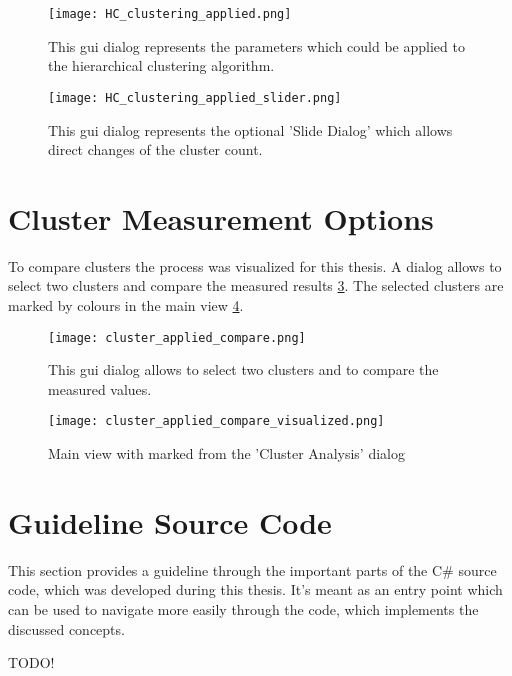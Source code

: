 \begin{figure}[ht]
    \centering
    \texttt{[image: HC\_clustering\_applied.png]}
    \caption{This gui dialog represents the parameters which could be applied to the hierarchical clustering algorithm.}
    \label{fig:applied_HC_clustering_GUI}
\end{figure}

\begin{figure}[ht]
    \centering
    \texttt{[image: HC\_clustering\_applied\_slider.png]}
    \caption{This gui dialog represents the optional 'Slide Dialog' which allows direct changes of the cluster count.}
    \label{fig:applied_HC_clustering_slider_GUI}
\end{figure}

\pagebreak
\section{Cluster Measurement Options}
To compare clusters the process was visualized for this thesis. A dialog allows to select two clusters and compare the measured results \ref{fig:applied_clustering_analysis_GUI}. The selected clusters are marked by colours in the main view \ref{fig:applied_clustering_analysis_visualized_GUI}.

\begin{figure}[ht]
    \centering
    \texttt{[image: cluster\_applied\_compare.png]}
    \caption{This gui dialog allows to select two clusters and to compare the measured values.}
    \label{fig:applied_clustering_analysis_GUI}
\end{figure}

\begin{figure}[ht]
    \centering
    \begin{mdframed}[style=border]
        \texttt{[image: cluster\_applied\_compare\_visualized.png]}
    \end{mdframed}
    \caption{Main view with marked from the 'Cluster Analysis' dialog}
    \label{fig:applied_clustering_analysis_visualized_GUI}
\end{figure}

\section{Guideline Source Code}
This section provides a guideline through the important parts of the C\# source code, which was developed during this thesis. It's meant as an entry point which can be used to navigate more easily through the code, which implements the discussed concepts.

TODO!